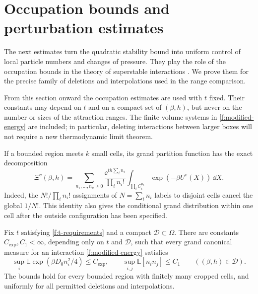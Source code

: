 \section{Occupation bounds and perturbation estimates}
\label{f:local-section}

The next estimates turn the quadratic stability bound into uniform
control of local particle numbers and changes of pressure.  They play
the role of the occupation bounds in the theory of superstable
interactions \citep{Ruelle1970}.  We prove them for the precise family
of deletions and interpolations used in the range comparison.

From this section onward the occupation estimates are used with $t$
fixed.  Their constants may depend on $t$ and on a compact set of
$(\beta,h)$, but never on the number or sizes of the attraction ranges.
The finite volume systems in \eqref{f:modified-energy} are included;
in particular, deleting interactions between larger boxes will not
require a new thermodynamic limit theorem.

If a bounded region meets $k$ small cells, its grand partition
function has the exact decomposition
\begin{equation}\label{f:cell-measure}
 \Xi^v(\beta,h)
 =\sum_{n_1,\ldots,n_k\ge0}
    \frac{\ee^{th\sum_i n_i}}{\prod_i n_i!}
    \int_{\prod_i C_i^{n_i}}\exp(-\beta U^v(X))\,\dd X.
\end{equation}
Indeed, the $N!/\prod_i n_i!$ assignments of $N=\sum_i n_i$ labels
to disjoint cells cancel the global $1/N!$.  This identity also gives
the conditional grand distribution within one cell after the outside
configuration has been specified.

\begin{proposition}\label{f:moments}
Fix $t$ satisfying \eqref{f:t-requirements} and a compact
$\mathcal D\subset\Omega$.  There are constants
$C_{\exp},C_1<\infty$, depending only on $t$ and $\mathcal D$, such
that every grand canonical measure for an interaction
\eqref{f:modified-energy} satisfies
\begin{equation}\label{f:moment-estimates}
 \sup_i\mathbb E\exp(\beta D_0n_i^2/4)\le C_{\exp},
 \qquad \sup_{i,j}\mathbb E[n_i n_j]\le C_1
 \qquad ((\beta,h)\in\mathcal D).
\end{equation}
The bounds hold for every bounded region with finitely many cropped
cells, and uniformly for all permitted deletions and interpolations.
\end{proposition}

